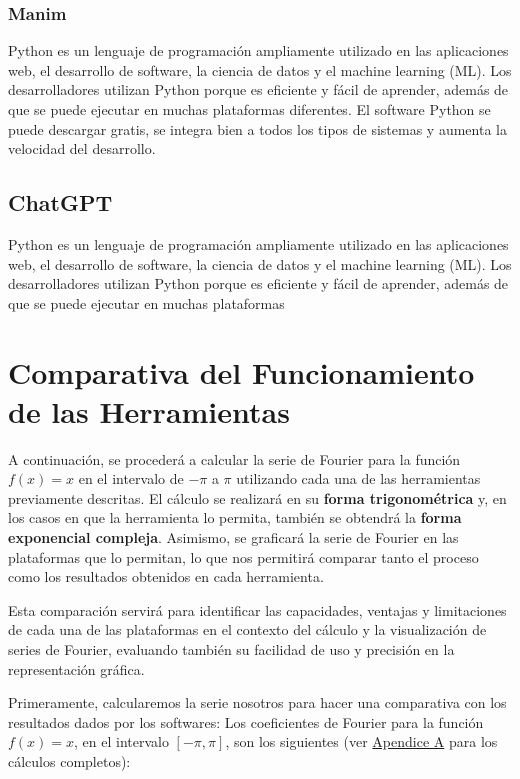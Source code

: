 \subsubsection{Manim}
Python es un lenguaje de programación ampliamente utilizado en las aplicaciones web, el desarrollo de software, la ciencia de datos y el machine learning (ML). Los desarrolladores utilizan Python porque es eficiente y fácil de aprender, además de que se puede ejecutar en muchas plataformas diferentes. El software Python se puede descargar gratis, se integra bien a todos los tipos de sistemas y aumenta la velocidad del desarrollo.

\subsection{ChatGPT}
Python es un lenguaje de programación ampliamente utilizado en las aplicaciones web, el desarrollo de software, la ciencia de datos y el machine learning (ML). Los desarrolladores utilizan Python porque es eficiente y fácil de aprender, además de que se puede ejecutar en muchas plataformas

\section{Comparativa del Funcionamiento de las Herramientas}

A continuación, se procederá a calcular la serie de Fourier para la función \( f(x) = x \) en el intervalo de \(-\pi\) a \(\pi\) utilizando cada una de las herramientas previamente descritas. El cálculo se realizará en su \textbf{forma trigonométrica} y, en los casos en que la herramienta lo permita, también se obtendrá la \textbf{forma exponencial compleja}. Asimismo, se graficará la serie de Fourier en las plataformas que lo permitan, lo que nos permitirá comparar tanto el proceso como los resultados obtenidos en cada herramienta. \newline

Esta comparación servirá para identificar las capacidades, ventajas y limitaciones de cada una de las plataformas en el contexto del cálculo y la visualización de series de Fourier, evaluando también su facilidad de uso y precisión en la representación gráfica.\newline

Primeramente, calcularemos la serie nosotros para hacer una comparativa con los resultados dados por los softwares:\newline
Los coeficientes de Fourier para la función \( f(x) = x \), en el intervalo \( [-\pi, \pi] \), son los siguientes (ver \hyperref[app:Estado-del-arte-coeff]{Apendice A} para los cálculos completos):

